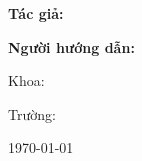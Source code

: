 
\begin{frame}
    \titlepage
\end{frame}

\begin{frame}
    \centering
    {\Large \textbf{Tác giả:} \TENTACGIA \par}
    {\Large \textbf{Người hướng dẫn:} \TENNGUOIHUONGDAN \par}
    \vspace{0.5cm}
    {\small Khoa: \KHOA \par}
    {\small Trường: \TRUONG \par}
    \vfill
    {\footnotesize \today}
\end{frame}

